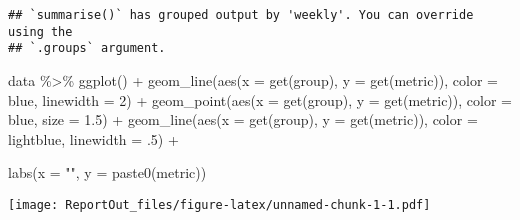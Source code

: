 \documentclass[
]{article}
\newenvironment{Shaded}{\begin{snugshade}}{\end{snugshade}}
\newcommand{\AttributeTok}[1]{\textcolor[rgb]{0.77,0.63,0.00}{#1}}
\newcommand{\DecValTok}[1]{\textcolor[rgb]{0.00,0.00,0.81}{#1}}
\newcommand{\FloatTok}[1]{\textcolor[rgb]{0.00,0.00,0.81}{#1}}
\newcommand{\FunctionTok}[1]{\textcolor[rgb]{0.00,0.00,0.00}{#1}}
\newcommand{\NormalTok}[1]{#1}
\newcommand{\SpecialCharTok}[1]{\textcolor[rgb]{0.00,0.00,0.00}{#1}}
\newcommand{\StringTok}[1]{\textcolor[rgb]{0.31,0.60,0.02}{#1}}
\begin{document}
\begin{verbatim}
## `summarise()` has grouped output by 'weekly'. You can override using the
## `.groups` argument.
\end{verbatim}

\begin{Shaded}
\begin{Highlighting}[]
\NormalTok{data }\SpecialCharTok{\%\textgreater{}\%}
  \FunctionTok{ggplot}\NormalTok{() }\SpecialCharTok{+}
      \FunctionTok{geom\_line}\NormalTok{(}\FunctionTok{aes}\NormalTok{(}\AttributeTok{x =} \FunctionTok{get}\NormalTok{(group), }\AttributeTok{y =} \FunctionTok{get}\NormalTok{(metric)), }\AttributeTok{color =}\NormalTok{ blue, }\AttributeTok{linewidth =} \DecValTok{2}\NormalTok{) }\SpecialCharTok{+}
      \FunctionTok{geom\_point}\NormalTok{(}\FunctionTok{aes}\NormalTok{(}\AttributeTok{x =} \FunctionTok{get}\NormalTok{(group), }\AttributeTok{y =} \FunctionTok{get}\NormalTok{(metric)), }\AttributeTok{color =}\NormalTok{ blue, }\AttributeTok{size =} \FloatTok{1.5}\NormalTok{) }\SpecialCharTok{+}
      \FunctionTok{geom\_line}\NormalTok{(}\FunctionTok{aes}\NormalTok{(}\AttributeTok{x =} \FunctionTok{get}\NormalTok{(group), }\AttributeTok{y =} \FunctionTok{get}\NormalTok{(metric)), }\AttributeTok{color =}\NormalTok{ lightblue, }\AttributeTok{linewidth =}\NormalTok{ .}\DecValTok{5}\NormalTok{) }\SpecialCharTok{+}



  
  \FunctionTok{labs}\NormalTok{(}\AttributeTok{x =} \StringTok{""}\NormalTok{,}
       \AttributeTok{y =} \FunctionTok{paste0}\NormalTok{(metric))}
\end{Highlighting}
\end{Shaded}

\texttt{[image: ReportOut\_files/figure-latex/unnamed-chunk-1-1.pdf]}
\end{document}
